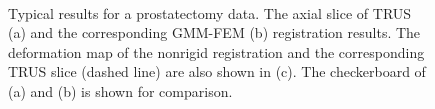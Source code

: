 \documentclass[journal]{IEEEtran}
\begin{document}
\begin{figure}
	\centering
	\hfill
	\\
	\hfill
   \caption{Typical results for a prostatectomy data. The axial slice of TRUS (a) and the corresponding GMM-FEM (b) registration results. The deformation map of the nonrigid registration and the corresponding TRUS slice (dashed line) are also shown in (c). The checkerboard of (a) and (b) is shown for comparison. \label{fig:exp2fig2}}
\end{figure}
\end{document}
